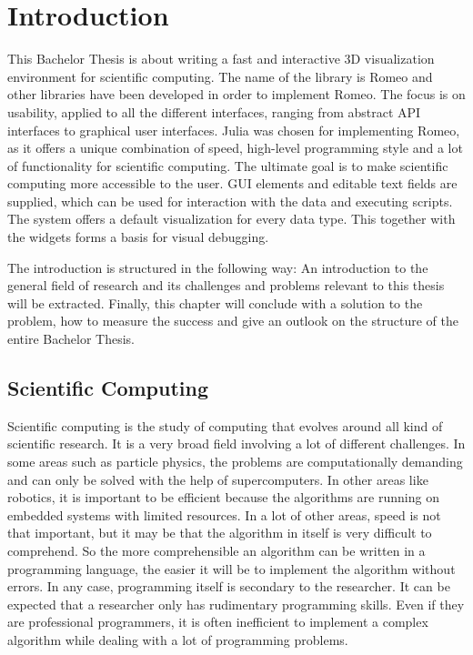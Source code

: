 \section{Introduction}
This Bachelor Thesis is about writing a fast and interactive 3D visualization environment for scientific computing.
The name of the library is Romeo and other libraries have been developed in order to implement Romeo. 
The focus is on usability, applied to all the different interfaces, ranging from abstract \ac{API} interfaces to graphical user interfaces. 
Julia was chosen for implementing Romeo, as it offers a unique combination of speed, high-level programming style and a lot of functionality for scientific computing.
The ultimate goal is to make scientific computing more accessible to the user.
\ac{GUI} elements and editable text fields are supplied, which can be used for interaction with the data and executing scripts.
The system offers a default visualization for every data type. This together with the widgets forms a basis for visual debugging.

The introduction is structured in the following way:
An introduction to the general field of research and its challenges and problems relevant to this thesis will be extracted.
Finally, this chapter will conclude with a solution to the problem, how to measure the success and give an outlook on the structure of the entire Bachelor Thesis.


\subsection{Scientific Computing}

Scientific computing is the study of computing that evolves around all kind of scientific research.
It is a very broad field involving a lot of different challenges. 
In some areas such as particle physics, the problems are computationally demanding and can only be solved with the help of supercomputers.
In other areas like robotics, it is important to be efficient because the algorithms are running on embedded systems with limited resources. 
In a lot of other areas, speed is not that important, but it may be that the algorithm in itself is very difficult to comprehend. 
So the more comprehensible an algorithm can be written in a programming language, the easier it will be to implement the algorithm without errors.
In any case, programming itself is secondary to the researcher.
It can be expected that a researcher only has rudimentary programming skills. 
Even if they are professional programmers, it is often inefficient to implement a complex algorithm while dealing with a lot of programming problems.

